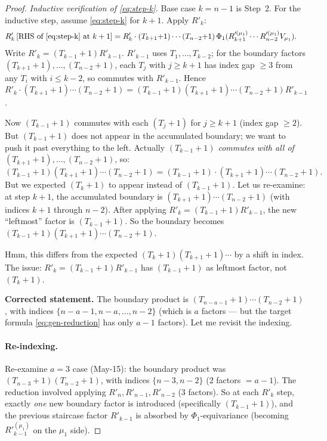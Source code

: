 \documentclass[11pt]{article}
\theoremstyle{definition}
\begin{document}
\begin{proof}
\emph{Inductive verification of \eqref{eq:step-k}.}  Base case
$k=n-1$ is Step~2.  For the inductive step, assume
\eqref{eq:step-k} for $k+1$.  Apply $R'_k$:
\begin{align*}
   R'_k\,[\text{RHS of \eqref{eq:step-k} at }k+1]
   &= R'_k\cdot(T_{k+1}{+}1)\cdots(T_{n-2}{+}1)\,
      \Phi_1(R'^{(\mu_1)}_{k+1}\cdots R'^{(\mu_1)}_{n-2}V_{\mu_1}).
\end{align*}
Write $R'_k=(T_{k-1}{+}1)R'_{k-1}$.  $R'_{k-1}$ uses
$T_1,\ldots,T_{k-2}$; for the boundary factors $(T_{k+1}{+}1),
\ldots,(T_{n-2}{+}1)$, each $T_j$ with $j\ge k+1$ has index gap
$\ge 3$ from any $T_i$ with $i\le k-2$, so commutes with
$R'_{k-1}$.  Hence
$R'_k\cdot(T_{k+1}{+}1)\cdots(T_{n-2}{+}1)
=(T_{k-1}{+}1)(T_{k+1}{+}1)\cdots(T_{n-2}{+}1)R'_{k-1}$.

Now $(T_{k-1}{+}1)$ commutes with each $(T_j{+}1)$ for $j\ge k+1$
(index gap $\ge 2$).  But $(T_{k-1}{+}1)$ does not appear in the
accumulated boundary; we want to push it past everything to the
left.  Actually \emph{$(T_{k-1}{+}1)$ commutes with all of
$(T_{k+1}{+}1),\ldots,(T_{n-2}{+}1)$}, so:
\[
   (T_{k-1}{+}1)(T_{k+1}{+}1)\cdots(T_{n-2}{+}1)
   =(T_{k-1}{+}1)\cdot(T_{k+1}{+}1)\cdots(T_{n-2}{+}1).
\]
But we expected $(T_k{+}1)$ to appear instead of $(T_{k-1}{+}1)$.
Let us re-examine: at step $k+1$, the accumulated boundary is
$(T_{k+1}{+}1)\cdots(T_{n-2}{+}1)$ (with indices $k+1$ through
$n-2$).  After applying $R'_k=(T_{k-1}{+}1)R'_{k-1}$, the new
``leftmost'' factor is $(T_{k-1}{+}1)$.  So the boundary becomes
$(T_{k-1}{+}1)(T_{k+1}{+}1)\cdots(T_{n-2}{+}1)$.

Hmm, this differs from the expected $(T_k{+}1)(T_{k+1}{+}1)\cdots$
by a shift in index.  The issue: $R'_k=(T_{k-1}{+}1)R'_{k-1}$ has
$(T_{k-1}{+}1)$ as leftmost factor, not $(T_k{+}1)$.

\textbf{Corrected statement.}  The boundary product is
$(T_{n-a-1}{+}1)\cdots(T_{n-2}{+}1)$, with indices
$\{n-a-1,n-a,\ldots,n-2\}$ (which is $a$ factors --- but the
target formula \eqref{eq:gen-reduction} has only $a-1$ factors).
Let me revisit the indexing.

\paragraph{Re-indexing.}  Re-examine $a=3$ case (May-15): the
boundary product was $(T_{n-3}{+}1)(T_{n-2}{+}1)$, with indices
$\{n-3,n-2\}$ ($2$ factors $=a-1$).  The reduction involved
applying $R'_n,R'_{n-1},R'_{n-2}$ ($3$ factors).  So at each
$R'_k$ step, exactly \emph{one} new boundary factor is introduced
(specifically $(T_{k-1}{+}1)$), and the previous staircase factor
$R'_{k-1}$ is absorbed by $\Phi_1$-equivariance (becoming
$R'^{(\mu_1)}_{k-1}$ on the $\mu_1$ side).


\end{proof}
\end{document}
